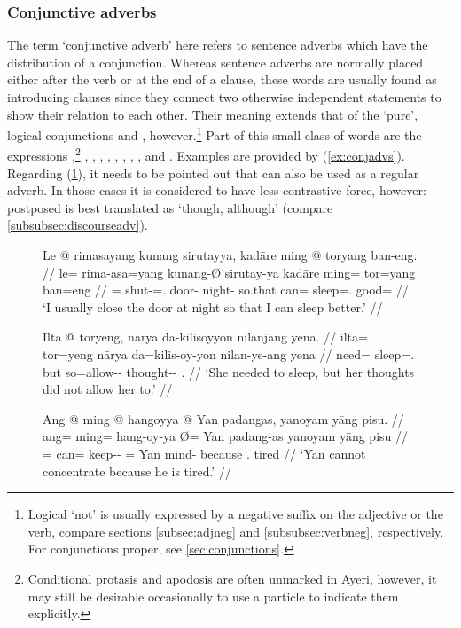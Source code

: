 \subsubsection{Conjunctive adverbs}
\label{subsubsec:conjadv}

The term `conjunctive adverb' here refers to sentence adverbs which have the
distribution of a conjunction. Whereas sentence adverbs are normally placed
either after the verb or at the end of a clause, these words are usually found
as introducing clauses since they connect two otherwise independent statements
to show their relation to each other. Their meaning extends that of the
`pure', logical conjunctions  and ,
however.\footnote{Logical `not' is usually expressed by a negative suffix on
the adjective or the verb, compare sections \ref{subsec:adjneg} and
\ref{subsubsec:verbneg}, respectively. For conjunctions proper, see
\autoref{sec:conjunctions}.} Part of this small class of words are the
expressions ,\footnote{Conditional protasis and
apodosis are often unmarked in Ayeri, however, it may still be desirable
occasionally to use a particle to indicate them explicitly.}
,
,
,
,
,
,
,
, and 
. Examples are provided by
(\ref{ex:conjadvs}). Regarding (\ref{ex:but}), it needs to be pointed out that
 can also be used as a regular adverb. In those cases it is
considered to have less contrastive force, however: postposed
 is best translated as `though, although' (compare
\autoref{subsubsec:discourseadv}).

\begin{figure}[h]
\pex\label{ex:conjadvs}
\a\begingl[glspace=.25em]
	\gla Le @ rimasayang kunang sirutayya, kadāre ming @ toryang ban-eng. //
	\glb le= rima-asa=yang kunang-Ø sirutay-ya kadāre ming= tor=yang 
		ban=eng //
	\glc \PatTI{}= shut-\Hab{}=\Fsg{}.\Aarg{} door-\Top{} night-\Loc{} 
		so.that can= sleep=\Fsg{}.\Aarg{} good=\Comp{} //
	\glft `I usually close the door at night so that I can sleep better.' //
\endgl

\a\label{ex:but}\begingl
	\gla Ilta @ toryeng, nārya da-kilisoyyon nilanjang yena. //
	\glb ilta= tor=yeng nārya da=kilis-oy-yon nilan-ye-ang yena //
	\glc need= sleep=\TsgF{}.\Aarg{} but so=allow-\Neg{}-\TplN{} 
		thought-\Pl{}-\Aarg{} \TsgF{}.\Gen{} //
	\glft `She needed to sleep, but her thoughts did not allow her to.' //
\endgl

\a\begingl
	\gla Ang @ ming @ hangoyya {} @ Yan padangas, yanoyam yāng pisu. //
	\glb ang= ming= hang-oy-ya Ø= Yan padang-as yanoyam yāng pisu //
	\glc \AgtT{}= can= keep-\Neg{}-\TsgM{} \Top{}= Yan mind-\Parg{} because 
		\TsgM{}.\Aarg{} tired //
	\glft `Yan cannot concentrate because he is tired.' //
\endgl
\xe
\end{figure}

